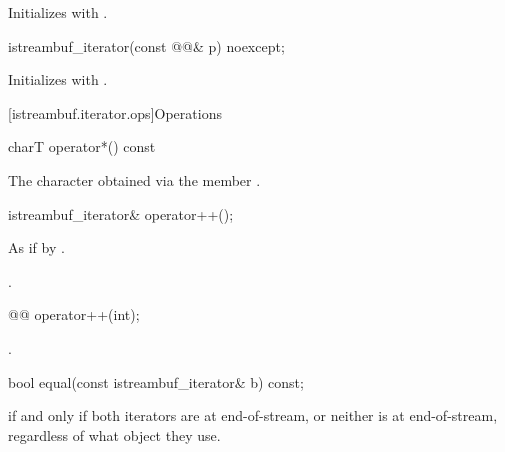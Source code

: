\begin{itemdescr}
\pnum
\effects
Initializes  with .
\end{itemdescr}


%
\begin{itemdecl}
istreambuf_iterator(const @@& p) noexcept;
\end{itemdecl}

\begin{itemdescr}
\pnum
\effects
Initializes  with .
\end{itemdescr}

[istreambuf.iterator.ops]{Operations}

%
\begin{itemdecl}
charT operator*() const
\end{itemdecl}

\begin{itemdescr}
\pnum
\returns
The character obtained via the
member
.
\end{itemdescr}

%
\begin{itemdecl}
istreambuf_iterator& operator++();
\end{itemdecl}

\begin{itemdescr}
\pnum
\effects
As if by .

\pnum
\returns
{}.
\end{itemdescr}

%
\begin{itemdecl}
@@ operator++(int);
\end{itemdecl}

\begin{itemdescr}
\pnum
\returns
{}.
\end{itemdescr}

%
\begin{itemdecl}
bool equal(const istreambuf_iterator& b) const;
\end{itemdecl}

\begin{itemdescr}
\pnum
\returns
{}
if and only if both iterators are at end-of-stream,
or neither is at end-of-stream, regardless of what
object they use.
\end{itemdescr}

